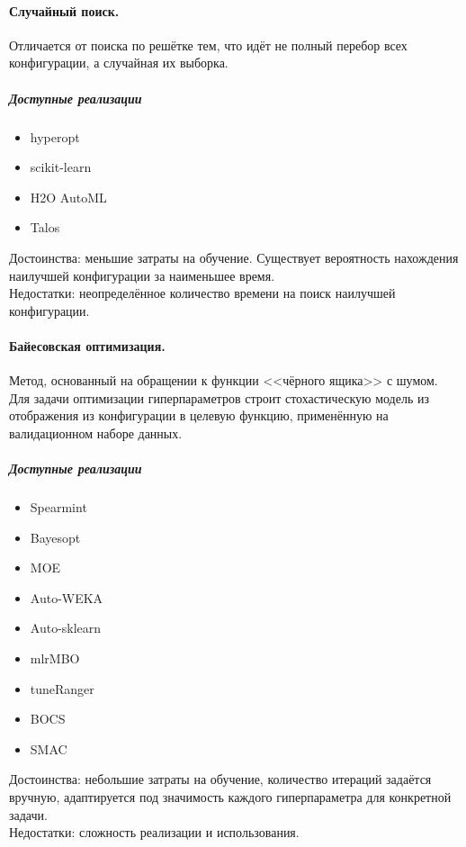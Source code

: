 \documentclass[times,specification,annotation]{itmo-student-thesis}
\begin{document}
	\paragraph{Случайный поиск.} Отличается от поиска по решётке тем, что идёт не полный перебор всех конфигурации, а случайная их выборка.
		\subparagraph{Доступные реализации}
		\begin{itemize}
			\item hyperopt \cite{Bergstra_2015}
			\item scikit-learn \cite{scikit-learn}
			\item H2O AutoML \cite{H2OAutoML}
			\item Talos \cite{talos}
		\end{itemize}
		Достоинства: меньшие затраты на обучение. Существует вероятность нахождения наилучшей конфигурации за наименьшее время. \\
		Недостатки: неопределённое количество времени на поиск наилучшей конфигурации.
	\paragraph{Байесовская оптимизация.}\label{pr:bo} Метод, основанный на обращении к функции <<чёрного ящика>> с шумом. Для задачи оптимизации гиперпараметров строит стохастическую модель из отображения из конфигурации в целевую функцию, применённую на валидационном наборе данных.
		\subparagraph{Доступные реализации}
		\begin{itemize}
			\item Spearmint \cite{hazan2017hyperparameter}
			\item Bayesopt \cite{martinezcantin2014bayesopt}
			\item MOE \cite{pham2020cnnmoe}
			\item Auto-WEKA \cite{thornton2012autoweka}
			\item Auto-sklearn \cite{NIPS2015_5872}
			\item mlrMBO \cite{bischl2017mlrmbo}
			\item tuneRanger \cite{Probst_2019}
			\item BOCS \cite{10.1145/3306346.3322996}
			\item SMAC \cite{schmidt2019performance}
		\end{itemize}
		Достоинства: небольшие затраты на обучение, количество итераций задаётся вручную, адаптируется под значимость каждого гиперпараметра для конкретной задачи. \\
		Недостатки: сложность реализации и использования.
\end{document}
